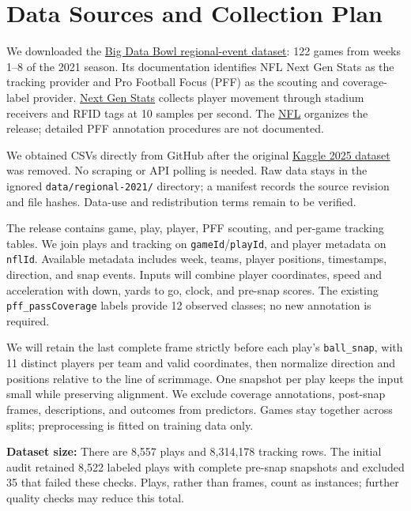 \documentclass[12pt]{article}
\begin{document}
\section*{Data Sources and Collection Plan}
We downloaded the \href{https://github.com/ThompsonJamesBliss/nfl-big-data-bowl-regional-event-data}{Big Data Bowl regional-event dataset}: 122 games from weeks 1--8 of the 2021 season. Its documentation identifies NFL Next Gen Stats as the tracking provider and Pro Football Focus (PFF) as the scouting and coverage-label provider. \href{https://edge-operations.nfl.com/game-operations-logistics/technology/performance-tracking-data-next-gen-stats}{Next Gen Stats} collects player movement through stadium receivers and RFID tags at 10 samples per second. The \href{https://operations.nfl.com/programs-initiatives/innovation/big-data-bowl}{NFL} organizes the release; detailed PFF annotation procedures are not documented.

We obtained CSVs directly from GitHub after the original \href{https://www.kaggle.com/competitions/nfl-big-data-bowl-2025/data}{Kaggle 2025 dataset} was removed. No scraping or API polling is needed. Raw data stays in the ignored \texttt{data/regional-2021/} directory; a manifest records the source revision and file hashes. Data-use and redistribution terms remain to be verified.

The release contains game, play, player, PFF scouting, and per-game tracking tables. We join plays and tracking on \texttt{gameId}/\texttt{playId}, and player metadata on \texttt{nflId}. Available metadata includes week, teams, player positions, timestamps, direction, and snap events. Inputs will combine player coordinates, speed and acceleration with down, yards to go, clock, and pre-snap scores. The existing \texttt{pff\_passCoverage} labels provide 12 observed classes; no new annotation is required.

We will retain the last complete frame strictly before each play's \texttt{ball\_snap}, with 11 distinct players per team and valid coordinates, then normalize direction and positions relative to the line of scrimmage. One snapshot per play keeps the input small while preserving alignment. We exclude coverage annotations, post-snap frames, descriptions, and outcomes from predictors. Games stay together across splits; preprocessing is fitted on training data only.

\textbf{Dataset size:} There are 8,557 plays and 8,314,178 tracking rows. The initial audit retained 8,522 labeled plays with complete pre-snap snapshots and excluded 35 that failed these checks. Plays, rather than frames, count as instances; further quality checks may reduce this total.
\end{document}

